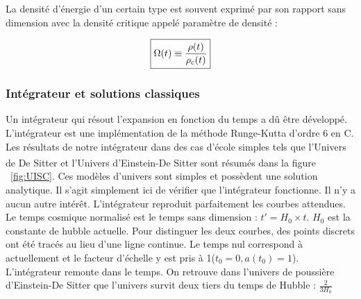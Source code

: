 \documentclass[10pt, a4paper]{report}
\numberwithin{equation}{subsection}
\begin{document}
La densité d'énergie d'un certain type est souvent exprimé par son rapport sans dimension avec la densité critique appelé paramètre de densité :

\begin{equation} \label{eq:OD}
\boxed{\Omega(t) \equiv \frac{\rho(t)}{\rho_{\rm c}(t)} }
\end{equation}

\subsubsection{Intégrateur et solutions classiques}
Un intégrateur qui résout l'expansion en fonction du temps a dû être développé.  L'intégrateur est une implémentation de la méthode Runge-Kutta d'ordre 6 en C. Les résultats de notre intégrateur dans des cas d'école simples tels que l'Univers de De Sitter\textsuperscript{\cite{cours_RG1}} et l'Univers d'Einstein-De Sitter\textsuperscript{\cite{cours_RG1}} sont résumés dans la figure ~\ref{fig:UISC}. Ces modèles d'univers sont simples et possèdent une solution analytique. Il s'agit simplement ici de vérifier que l'intégrateur fonctionne. Il n'y a aucun autre intérêt. L'intégrateur reproduit parfaitement les courbes attendues. Le temps cosmique normalisé est le temps sans dimension : $t' = H_0 \times t$. $H_0$ est la constante de hubble actuelle. Pour distinguer les deux courbes, des points discrets ont été tracés au lieu d'une ligne continue.  Le temps nul correspond à actuellement et le facteur d'échelle y est pris à 1($t_0=0, a(t_0)=1$). L'intégrateur remonte dans le temps. On retrouve dans l'univers de poussière d'Einstein-De Sitter que l'univers survit deux tiers du temps de Hubble : $\frac{2}{3H_0}$ 
\end{document}
